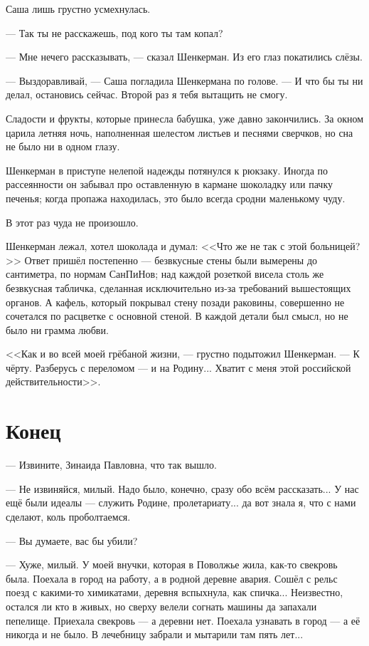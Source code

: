 \documentclass[a4paper,10pt,fleqn]{book}\usepackage{polyglossia}\setdefaultlanguage{english}\setotherlanguage{russian}\defaultfontfeatures{Ligatures=TeX,Mapping=tex-text} \usepackage{xcolor}\definecolor{lightgray}{HTML}{bbbbbb}\color{lightgray}\newcommand{\ml}[3]{\textcolor{black}{#3}}
\begin{document}
Саша лишь грустно усмехнулась.

--- Так ты не расскажешь, под кого ты там копал?

--- Мне нечего рассказывать, --- сказал Шенкерман.
Из его глаз покатились слёзы.

--- Выздоравливай, --- Саша погладила Шенкермана по голове.
--- И что бы ты ни делал, остановись сейчас.
Второй раз я тебя вытащить не смогу.

Сладости и фрукты, которые принесла бабушка, уже давно закончились.
За окном царила летняя ночь, наполненная шелестом листьев и песнями сверчков, но сна не было ни в одном глазу.

Шенкерман в приступе нелепой надежды потянулся к рюкзаку.
Иногда по рассеянности он забывал про оставленную в кармане шоколадку или пачку печенья;
когда пропажа находилась, это было всегда сродни маленькому чуду.

В этот раз чуда не произошло.

Шенкерман лежал, хотел шоколада и думал: <<Что же не так с этой больницей?>>
Ответ пришёл постепенно --- безвкусные стены были вымерены до сантиметра, по нормам СанПиНов;
над каждой розеткой висела столь же безвкусная табличка, сделанная исключительно из-за требований вышестоящих органов.
А кафель, который покрывал стену позади раковины, совершенно не сочетался по расцветке с основной стеной.
В каждой детали был смысл, но не было ни грамма любви.

<<Как и во всей моей грёбаной жизни, --- грустно подытожил Шенкерман.
--- К чёрту.
Разберусь с переломом --- и на Родину...
Хватит с меня этой российской действительности>>.

\section{Конец}

--- Извините, Зинаида Павловна, что так вышло.

--- Не извиняйся, милый.
Надо было, конечно, сразу обо всём рассказать...
У нас ещё были идеалы --- служить Родине, пролетариату... да вот знала я, что с нами сделают, коль проболтаемся.

--- Вы думаете, вас бы убили?

--- Хуже, милый.
У моей внучки, которая в Поволжье жила, как-то свекровь была.
Поехала в город на работу, а в родной деревне авария.
Сошёл с рельс поезд с какими-то химикатами, деревня вспыхнула, как спичка...
Неизвестно, остался ли кто в живых, но сверху велели согнать машины да запахали пепелище.
Приехала свекровь --- а деревни нет.
Поехала узнавать в город --- а её никогда и не было.
В лечебницу забрали и мытарили там пять лет...
\end{document}
